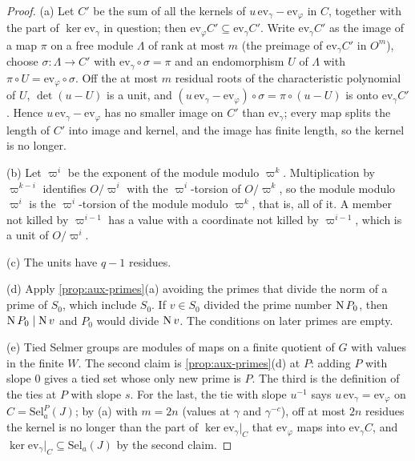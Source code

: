 \begin{proof}
(a) Let $C'$ be the sum of all the kernels of $u\,\mathrm{ev}_\gamma-\mathrm{ev}_\varphi$ in $C$, together with the part of $\ker\mathrm{ev}_\gamma$ in question; then $\mathrm{ev}_\varphi C'\subseteq\mathrm{ev}_\gamma C'$. Write $\mathrm{ev}_\gamma C'$ as the image of a map $\pi$ on a free module $\Lambda$ of rank at most $m$ (the preimage of $\mathrm{ev}_\gamma C'$ in
$O^m$), choose $\sigma\colon\Lambda\to C'$ with $\mathrm{ev}_\gamma\circ\sigma=\pi$ and an endomorphism $U$ of $\Lambda$ with $\pi\circ U=\mathrm{ev}_\varphi\circ\sigma$. Off the at most $m$ residual roots of the characteristic polynomial of $U$, $\det(u-U)$ is a unit, and $(u\,\mathrm{ev}_\gamma-\mathrm{ev}_\varphi)\circ\sigma=\pi\circ(u-U)$
is onto $\mathrm{ev}_\gamma C'$. Hence $u\,\mathrm{ev}_\gamma-\mathrm{ev}_\varphi$ has no smaller image on $C'$ than $\mathrm{ev}_\gamma$; every map splits the length of $C'$ into image and kernel, and the image has finite length, so the kernel is no longer.

(b) Let $\varpi^i$ be the exponent of the module modulo $\varpi^k$. Multiplication by $\varpi^{k-i}$ identifies $O/\varpi^i$ with the $\varpi^i$-torsion of $O/\varpi^k$, so the module modulo $\varpi^i$ is the $\varpi^i$-torsion of the module modulo $\varpi^k$, that is, all of it. A member not killed by $\varpi^{i-1}$ has a value with a coordinate not killed by $\varpi^{i-1}$, which is a
unit of $O/\varpi^i$.

(c) The units have $q-1$ residues.

(d) Apply \cref{prop:aux-primes}(a) avoiding the primes that divide the norm of a prime of $S_0$, which include $S_0$. If $v\in S_0$ divided the prime number $\operatorname{N} P_0$, then $\operatorname{N} P_0\mid\operatorname{N} v$ and $P_0$ would divide $\operatorname{N} v$. The conditions on later primes are empty.

(e) Tied Selmer groups are modules of maps on a finite quotient of $G$ with values in the finite $W$. The second claim is \cref{prop:aux-primes}(d) at $P$: adding $P$ with slope $0$ gives a tied set whose only new prime is $P$. The third is the definition of the ties at $P$ with slope $s$. For the last, the tie with slope $u^{-1}$ says $u\,\mathrm{ev}_\gamma=\mathrm{ev}_\varphi$ on
$C=\mathrm{Sel}^P_a(J)$; by (a) with $m=2n$ (values at $\gamma$ and $\gamma^{-c}$), off at most $2n$ residues the kernel is no longer than the part of $\ker\mathrm{ev}_\gamma|_C$ that $\mathrm{ev}_\varphi$ maps into $\mathrm{ev}_\gamma C$, and $\ker\mathrm{ev}_\gamma|_C\subseteq\mathrm{Sel}_a(J)$ by the second claim.
\end{proof}

